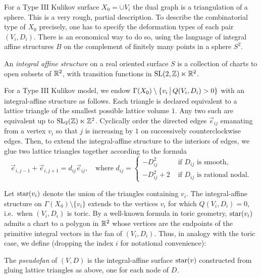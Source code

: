 \documentclass{amsart}
\begin{document}
\smallskip

For a Type III Kulikov surface $X_0=\cup V_i$ the dual graph is a
triangulation of a sphere. This is a very rough, partial
description. To describe the combinatorial type of $X_0$ precisely, one
has to specify the deformation types of each pair $(V_i,D_i)$.
There is an economical way to do so, using the language of
integral affine structures $B$ on the complement of finitely many
points in a sphere $S^2$.

\begin{definition} 
An \emph{integral affine structure} on a real oriented surface $S$ is
a collection of charts to open subsets of ${\mathbb R}^2$, with transition
functions in $\operatorname{SL}(2,{\mathbb Z})\ltimes{\mathbb R}^2$.
\end{definition}

For a Type III Kulikov model, we endow $\Gamma(X_0)\setminus \{v_i\,\big{|}\,Q(V_i,D_i)>0\}$
with an integral-affine structure as follows. Each triangle is declared equivalent
to a lattice triangle of the smallest possible lattice volume $1$. Any two such are equivalent
up to $\operatorname{SL}_2({\mathbb Z})\ltimes {\mathbb Z}^2$. Cyclically order the directed edges $\vec{e}_{ij}$ 
emanating from a vertex $v_i$ so that $j$ is increasing by $1$ on successively
counterclockwise edges. Then, to extend the integral-affine structure to the interiors of edges,
we glue two lattice triangles together according to the formula
\begin{displaymath}
  \vec e_{i, j-1} + \vec e_{i, j+1} = d_{ij}\vec e_{ij}, \quad
  \text{where }
  d_{ij}=\begin{cases}
    -D_{ij}^2 & \text{ if } D_{ij} \text{ is smooth,}\\
    -D_{ij}^2+2 & \text{ if } D_{ij} \text{ is rational nodal.}
    \end{cases}
\end{displaymath}

Let ${\rm star}(v_i)$ denote the union of the triangles containing 
$v_i$. The integral-affine structure on $\Gamma(X_0)\setminus \{v_i\}$ extends to the vertices
$v_i$ for which $Q(V_i,D_i)=0$, i.e.~when $(V_i,D_i)$ is toric. By a well-known
formula in toric geometry, ${\rm star}(v_i)$
admits a chart to a polygon in ${\mathbb R}^2$ whose vertices are the endpoints of
the primitive integral vectors in the fan of $(V_i,D_i)$.
Thus, in analogy with the toric case, we define (dropping
the index $i$ for notational convenience):

\begin{definition} The {\it pseudofan} of $(V,D)$ is
the integral-affine surface ${\rm star}(v)$ constructed from gluing
lattice triangles as above, one for each node of $D$. \end{definition}
\end{document}
